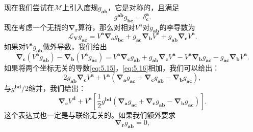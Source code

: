 现在我们尝试在$\mathcal{M}$上引入度规$g_{\boldsymbol{ab}}$，它是对称的，且满足
\begin{equation*}
	g^{\boldsymbol{ab}} g_{\boldsymbol{bc}} =\delta _{\boldsymbol{c}}^{\boldsymbol{a}} .
\end{equation*}
现在考虑一个无挠的$\boldsymbol{\nabla }_{\boldsymbol{r}}$算符，那么对相对$V^{\boldsymbol{a}}$对$g_{\boldsymbol{ab}}$的李导数为
\begin{equation}
	\mathcal{L}_{\boldsymbol{V}} g_{\boldsymbol{ac}} =V^{\boldsymbol{a}}\boldsymbol{\nabla }_{\boldsymbol{a}} g_{\boldsymbol{bc}} +g_{\boldsymbol{ac}}\boldsymbol{\nabla }_{\boldsymbol{b}} V^{\boldsymbol{c}} +g_{\boldsymbol{ab}}\boldsymbol{\nabla }_{\boldsymbol{c}} V^{\boldsymbol{a}} .
	\label{eq:5.15}
\end{equation}
如果对$V^{\boldsymbol{a}} g_{\boldsymbol{ab}}$做外导数，我们给出
\begin{equation}
	\boldsymbol{\nabla }_{\boldsymbol{c}} (V^{\boldsymbol{a}} g_{\boldsymbol{ab}} )-\boldsymbol{\nabla }_{\boldsymbol{b}} (V^{\boldsymbol{a}} g_{\boldsymbol{ac}} )=V^{\boldsymbol{a}}\boldsymbol{\nabla }_{\boldsymbol{c}} g_{\boldsymbol{ab}} +g_{\boldsymbol{ab}}\boldsymbol{\nabla }_{\boldsymbol{c}} V^{\boldsymbol{a}} -V^{\boldsymbol{a}}\boldsymbol{\nabla }_{\boldsymbol{b}} g_{\boldsymbol{ac}} -g_{\boldsymbol{ac}}\boldsymbol{\nabla }_{\boldsymbol{b}} V^{\boldsymbol{a}} .
	\label{eq:5.16}
\end{equation}
如果将两个坐标无关的导数\ref{eq:5.15}，\ref{eq:5.16}相加，我们可以给出：
\begin{equation*}
	2g_{\boldsymbol{ab}}\boldsymbol{\nabla }_{\boldsymbol{c}} V^{\boldsymbol{a}} +V^{\boldsymbol{a}} (\boldsymbol{\nabla }_{\boldsymbol{a}} g_{\boldsymbol{ac}} +\boldsymbol{\nabla }_{\boldsymbol{c}} g_{\boldsymbol{ab}} -\boldsymbol{\nabla }_{\boldsymbol{b}} g_{\boldsymbol{ac}} ),
\end{equation*}
与$g^{\boldsymbol{bd}} /2$缩并，我们给出：
\begin{equation}
	\boldsymbol{\nabla }_{\boldsymbol{c}} V^{\boldsymbol{d}} +V^{\boldsymbol{a}}\left[\frac{1}{2} g^{\boldsymbol{bd}}(\boldsymbol{\nabla }_{\boldsymbol{a}} g_{\boldsymbol{ac}} +\boldsymbol{\nabla }_{\boldsymbol{c}} g_{\boldsymbol{ab}} -\boldsymbol{\nabla }_{\boldsymbol{b}} g_{\boldsymbol{ac}})\right] .
	\label{eq:5.17}
\end{equation}
这个表达式也一定是与联络无关的。如果我们额外要求
\begin{equation*}
	\boldsymbol{\nabla }_{\boldsymbol{r}} g_{\boldsymbol{ab}} =0,
\end{equation*}
